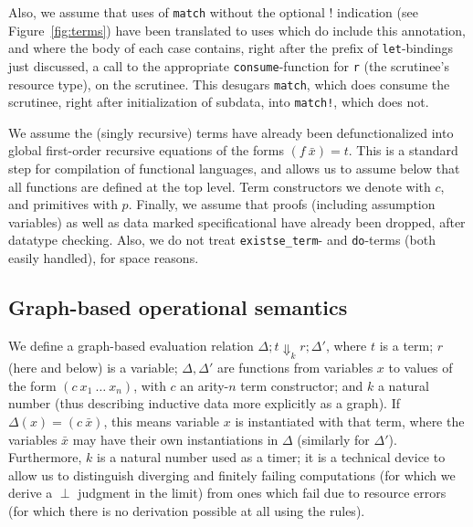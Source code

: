 \documentclass[9pt,natbib]{sigplanconf}
\begin{document}
\noindent Also, we assume that uses of \texttt{match} without the
optional $!$ indication (see Figure~\ref{fig:terms}) have been
translated to uses which do include this annotation, and where the
body of each case contains, right after the prefix of
\texttt{let}-bindings just discussed, a call to the appropriate
\texttt{consume}-function for \texttt{r} (the scrutinee's resource
type), on the scrutinee.  This desugars \texttt{match}, which does
consume the scrutinee, right after initialization of subdata, into
\texttt{match!}, which does not.  

We assume the (singly recursive) terms have already been
defunctionalized into global first-order recursive equations of the
forms $(f\ \bar{x}) = t$.  This is a standard step for compilation of
functional languages, and allows us to assume below that all functions
are defined at the top level.  Term constructors we denote with $c$,
and primitives with $p$. Finally, we assume that proofs (including
assumption variables) as well as data marked specificational have
already been dropped, after datatype checking.  Also, we do not treat
\texttt{existse\_term}- and \texttt{do}-terms (both easily handled),
for space reasons.

\subsection{Graph-based operational semantics}

We define a graph-based evaluation relation $\Delta; t \Downarrow_k r;
\Delta'$, where $t$ is a term; $r$ (here and below) is a variable;
$\Delta, \Delta'$ are functions from variables $x$ to values of the
form $(c\ x_1\ \ldots\ x_n)$, with $c$ an arity-$n$ term constructor;
and $k$ a natural number (thus describing inductive data more
explicitly as a graph).  If $\Delta(x) = (c\ \bar{x})$, this means
variable $x$ is instantiated with that term, where the variables
$\bar{x}$ may have their own instantiations in $\Delta$ (similarly for
$\Delta'$).  Furthermore, $k$ is a natural number used as a timer; it
is a technical device to allow us to distinguish diverging and
finitely failing computations (for which we derive a $\perp$ judgment
in the limit) from ones which fail due to resource errors (for which
there is no derivation possible at all using the rules).
\end{document}
